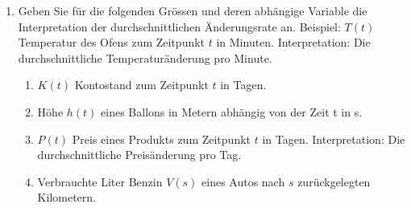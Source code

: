 \begin{enumerate}
    \item Geben Sie für die folgenden Grössen und deren abhängige Variable die Interpretation der durchschnittlichen Änderungsrate an. Beispiel: $T(t)$ Temperatur des Ofens zum Zeitpunkt $t$ in Minuten. Interpretation: Die durchschnittliche Temperaturänderung pro Minute.
          \begin{enumerate}
              \item $K(t)$ Kontostand zum Zeitpunkt $t$ in Tagen.
              \item Höhe $h(t)$ eines Ballons in Metern abhängig von der Zeit t in s.
              \item $P(t)$ Preis eines Produkts zum Zeitpunkt $t$ in Tagen. Interpretation: Die durchschnittliche Preisänderung pro Tag.
              \item Verbrauchte Liter Benzin $V(s)$ eines Autos nach $s$ zurückgelegten Kilometern.
          \end{enumerate}
\end{enumerate}
\newpage
